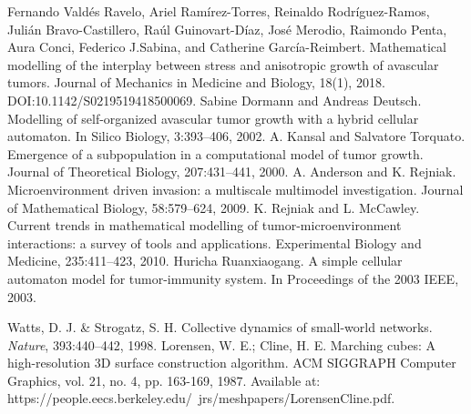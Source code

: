 \begin{thebibliography}{99}
\vskip 0.2cm
Fernando Vald\'es Ravelo, Ariel Ram\'irez-Torres, Reinaldo Rodr\'iguez-Ramos, Juli\'an Bravo-Castillero, Ra\'ul Guinovart-D\'iaz, Jos\'e Merodio, Raimondo Penta, Aura Conci, Federico J.Sabina, and Catherine Garc\'ia-Reimbert. Mathematical modelling of the interplay between stress and anisotropic growth of avascular tumors. Journal of Mechanics in Medicine and Biology, 18(1), 2018. DOI:10.1142/S0219519418500069.
\vskip 0.2cm
Sabine Dormann and Andreas Deutsch. Modelling of self-organized avascular tumor growth with a hybrid cellular automaton. In Silico Biology, 3:393–406, 2002.
\vskip 0.2cm
A. Kansal and Salvatore Torquato. Emergence of a subpopulation in a computational model of tumor growth. Journal of Theoretical Biology, 207:431–441, 2000.
\vskip 0.2cm
A. Anderson and K. Rejniak. Microenvironment driven invasion: a multiscale multimodel investigation. Journal of Mathematical Biology, 58:579–624, 2009.
\vskip 0.2cm
K. Rejniak and L. McCawley. Current trends in mathematical modelling of tumor-microenvironment interactions: a survey of tools and applications. Experimental Biology and Medicine, 235:411–423, 2010.
\vskip 0.2cm
Huricha Ruanxiaogang. A simple cellular automaton model for tumor-immunity system. In Proceedings of the 2003 IEEE, 2003.
    
\vskip 0.2cm
 Watts, D. J. \& Strogatz, S. H. Collective dynamics of small-world networks. \textit{Nature}, 393:440–442, 1998.
\vskip 0.2cm
 Lorensen, W. E.; Cline, H. E. Marching cubes: A high-resolution 3D surface construction algorithm. ACM SIGGRAPH Computer Graphics, vol. 21, no. 4, pp. 163-169, 1987. Available at: https://people.eecs.berkeley.edu/~jrs/meshpapers/LorensenCline.pdf.\\ 
\end{thebibliography}